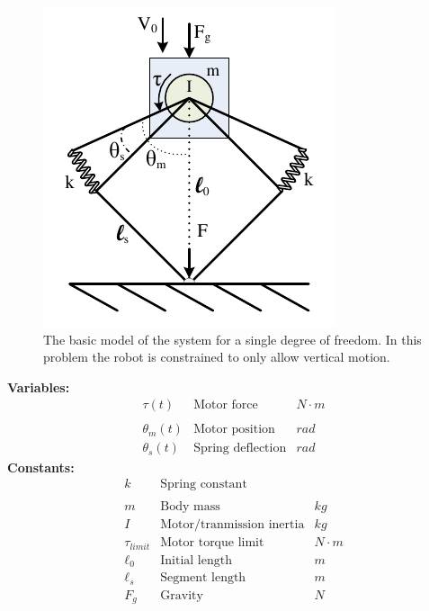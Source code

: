 \documentclass[letterpaper, 12 pt]{article}  %
\begin{document}
	\begin{figure}[h]
		\centering
		\includegraphics[scale=1.5]{./images/SEDA_atrias.pdf}
		\caption{	The basic model of the system for a single degree of freedom.
					In this problem the robot is constrained to only allow vertical
					motion.}
		\label{fig:SEDA}
	\end{figure}
	

	\begin{center}
	\textbf{Variables:}
	\[
	\begin{array}{c|l|l}
	\tau(t) & \textrm{Motor force} & N\cdot m\\
	 & \\
	\theta_{m}(t) & \textrm{Motor position} & rad\\
	\theta_{s}(t) & \textrm{Spring deflection} & rad\end{array}\]
	\textbf{Constants:}\[
	\begin{array}{c|l|l}
	k & \textrm{Spring constant}\\
	 & \\
	m & \textrm{Body mass} & kg\\
	I & \textrm{Motor/tranmission inertia} & kg\\
	\tau_{limit} & \textrm{Motor torque limit} & N\cdot m\\
	\ell_{0} & \text{Initial length} & m\\
	\ell_{s} & \text{Segment length} & m\\
	F_{g} & \text{Gravity} & N\end{array}\]

	\par
	\end{center}
\end{document}
